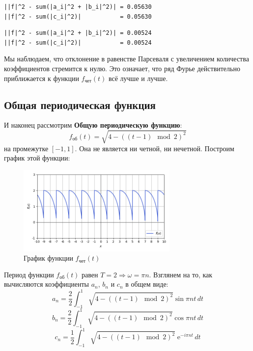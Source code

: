 \documentclass[a4paper]{article}
\newcommand{\e}{\;\text{e}}
\begin{document}
\begin{minipage}{0.48\textwidth}
\begin{lstlisting}[caption={Равенство Парсеваля при $n=1$}]
||f|^2 - sum(|a_i|^2 + |b_i|^2)| = 0.05630
||f|^2 - sum(|c_i|^2)|           = 0.05630
\end{lstlisting}
\end{minipage}\hfill
\begin{minipage}{0.48\textwidth}
\begin{lstlisting}[caption={Равенство Парсеваля при $n=80$}, numbers=none]
||f|^2 - sum(|a_i|^2 + |b_i|^2)| = 0.00524
||f|^2 - sum(|c_i|^2)|           = 0.00524
\end{lstlisting}
\end{minipage}
Мы наблюдаем, что отклонение в равенстве Парсеваля с увеличением количества коэффициентов стремится к нулю. Это означает, что ряд Фурье действительно приближается к функции $f_\text{чет}(t)$ всё лучше и лучше.

\subsection{Общая периодическая функция}
И наконец рассмотрим \textbf{Общую периодическую функцию}: $$f_\text{об}(t) =\sqrt{4 - ((t - 1) \mod 2)^2}$$ на промежутке $\left[-1, 1\right]$. Она не является ни четной, ни нечетной. Построим график этой функции:
\begin{figure}[H]
    \centering 
    \includegraphics[width=0.7\textwidth]{per/func.png}
    \caption{График функции $f_\text{чет}(t)$}
\end{figure}

Период функции $f_\text{об}(t)$ равен $T=2 \Rightarrow \omega=\pi n$. 
Взглянем на то, как вычисляются коэффициенты $a_n$, $b_n$ и $c_n$ в общем виде:
$$a_n = \frac{2}{2}\int_{-1}^{1} \sqrt{4 - ((t - 1) \mod 2)^2}\sin \pi nt\,dt$$
$$b_n = \frac{2}{2}\int_{-1}^{1} \sqrt{4 - ((t - 1) \mod 2)^2}\cos \pi nt\,dt$$  
$$c_n = \frac{1}{2}\int_{-1}^{1}\sqrt{4 - ((t - 1) \mod 2)^2}\e^{-i\pi nt}\,dt$$    
\end{document}
